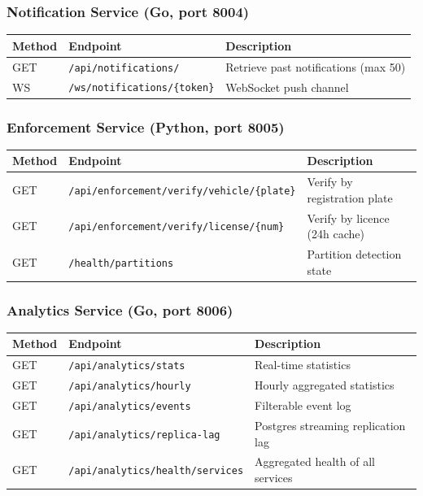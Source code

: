 \documentclass[12pt,a4paper]{article}
\begin{document}
\subsubsection{Notification Service (Go, port 8004)}

\begin{table}[H]
\centering\small
\begin{tabularx}{\textwidth}{l l X}
  \toprule
  \textbf{Method} & \textbf{Endpoint} & \textbf{Description} \\
  \midrule
  GET & \texttt{/api/notifications/}       & Retrieve past notifications (max 50) \\
  WS  & \texttt{/ws/notifications/\{token\}} & WebSocket push channel \\
  \bottomrule
\end{tabularx}
\end{table}

\subsubsection{Enforcement Service (Python, port 8005)}

\begin{table}[H]
\centering\small
\begin{tabularx}{\textwidth}{l l X}
  \toprule
  \textbf{Method} & \textbf{Endpoint} & \textbf{Description} \\
  \midrule
  GET & \texttt{/api/enforcement/verify/vehicle/\{plate\}}  & Verify by registration plate \\
  GET & \texttt{/api/enforcement/verify/license/\{num\}}    & Verify by licence (24h cache) \\
  GET & \texttt{/health/partitions}                         & Partition detection state \\
  \bottomrule
\end{tabularx}
\end{table}

\subsubsection{Analytics Service (Go, port 8006)}

\begin{table}[H]
\centering\small
\begin{tabularx}{\textwidth}{l l X}
  \toprule
  \textbf{Method} & \textbf{Endpoint} & \textbf{Description} \\
  \midrule
  GET & \texttt{/api/analytics/stats}            & Real-time statistics \\
  GET & \texttt{/api/analytics/hourly}           & Hourly aggregated statistics \\
  GET & \texttt{/api/analytics/events}           & Filterable event log \\
  GET & \texttt{/api/analytics/replica-lag}      & Postgres streaming replication lag \\
  GET & \texttt{/api/analytics/health/services}  & Aggregated health of all services \\
  \bottomrule
\end{tabularx}
\end{table}
\end{document}
